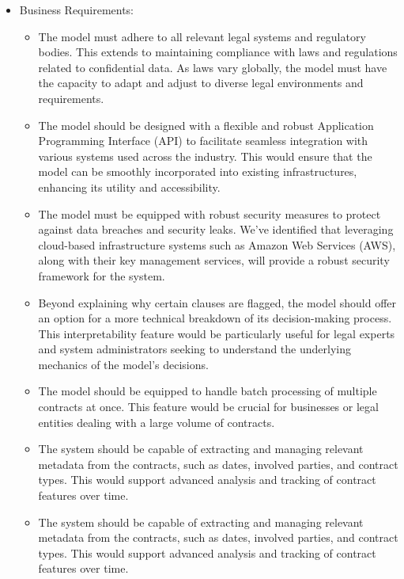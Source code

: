 \begin{itemize}
\begin{itemize}
    \end{itemize}
    \item Business Requirements: 
    \begin{itemize}
        \item The model must adhere to all relevant legal systems and regulatory bodies. This extends to maintaining compliance with laws and regulations related to confidential data. As laws vary globally, the model must have the capacity to adapt and adjust to diverse legal environments and requirements.
        \item The model should be designed with a flexible and robust Application Programming Interface (API) to facilitate seamless integration with various systems used across the industry. This would ensure that the model can be smoothly incorporated into existing infrastructures, enhancing its utility and accessibility.
        \item The model must be equipped with robust security measures to protect against data breaches and security leaks. We've identified that leveraging cloud-based infrastructure systems such as Amazon Web Services (AWS), along with their key management services, will provide a robust security framework for the system.
        \item Beyond explaining why certain clauses are flagged, the model should offer an option for a more technical breakdown of its decision-making process. This interpretability feature would be particularly useful for legal experts and system administrators seeking to understand the underlying mechanics of the model's decisions.
        \item The model should be equipped to handle batch processing of multiple contracts at once. This feature would be crucial for businesses or legal entities dealing with a large volume of contracts.
        \item The system should be capable of extracting and managing relevant metadata from the contracts, such as dates, involved parties, and contract types. This would support advanced analysis and tracking of contract features over time.
        \item The system should be capable of extracting and managing relevant metadata from the contracts, such as dates, involved parties, and contract types. This would support advanced analysis and tracking of contract features over time.















\end{itemize}
\end{itemize}
